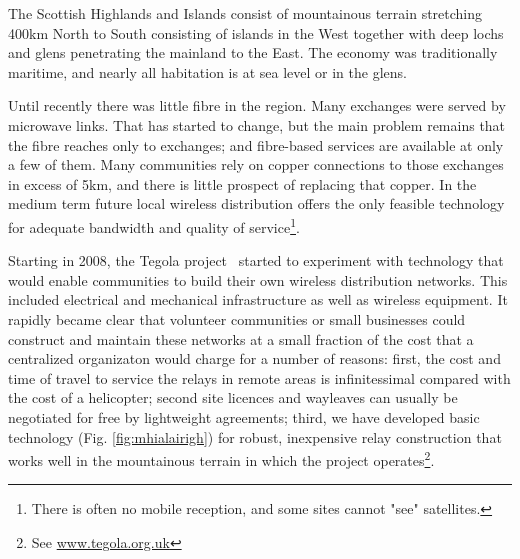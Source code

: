 
The Scottish Highlands and Islands consist of mountainous  terrain stretching 400km North to South consisting of islands in the West together with deep lochs and glens penetrating the mainland to the East.  The economy was traditionally maritime, and nearly all habitation is at sea level or in the glens.  

Until recently there was little fibre in the region.  Many exchanges were served by microwave links. That has started to change, but the main problem remains that the fibre reaches only to exchanges; and fibre-based services are available at only a few of them.  Many communities rely on copper connections to those exchanges in excess of 5km, and there is little prospect of replacing that copper.  In the medium term future local wireless distribution offers the only feasible technology for adequate bandwidth and quality of service\footnote{There is often no mobile reception, and some sites cannot "see" satellites.}.

Starting in 2008, the Tegola project~\cite{tegola} started to experiment with technology that would enable communities to build their own wireless distribution networks.  This included electrical and mechanical infrastructure as well as wireless equipment.  It rapidly became clear that volunteer communities or small businesses could construct and maintain these networks at a small fraction of the cost that a centralized organizaton would charge for a number of reasons: first, the cost and time of travel to service the relays in remote areas is infinitessimal compared with the cost of a helicopter; second site licences and wayleaves can usually be negotiated for free by lightweight agreements; third, we have developed basic technology (Fig. \ref{fig:mhialairigh}) for robust, inexpensive relay construction that works well in the mountainous terrain in which the project operates\footnote{See \url{www.tegola.org.uk}}.


